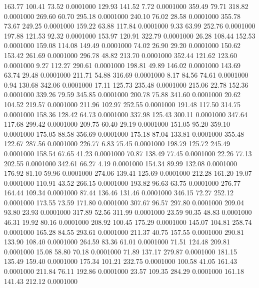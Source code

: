  163.77  100.41   73.52   0.0001000
 129.93  141.52    7.72   0.0001000
 359.49   79.71  318.82   0.0001000
 269.60   60.70  295.18   0.0001000
 240.10   76.02   28.58   0.0001000
 355.78   73.67  249.25   0.0001000
 159.22   63.88  117.84   0.0001000
   9.33   63.99  252.76   0.0001000
 197.88  121.53   92.32   0.0001000
 153.97  120.91  322.79   0.0001000
  26.28  108.44  152.53   0.0001000
 159.08  114.08  149.49   0.0001000
  74.02   26.90   29.20   0.0001000
 150.62  153.42  261.69   0.0001000
 296.78   48.82  213.70   0.0001000
 352.44  121.62  123.60   0.0001000
   9.27  112.27  290.61   0.0001000
 198.81   49.89  146.02   0.0001000
 143.69   63.74   29.48   0.0001000
 211.71   54.88  316.69   0.0001000
   8.17   84.56   74.61   0.0001000
   0.94  130.68  342.06   0.0001000
  17.11  125.73  235.48   0.0001000
 215.06   22.78  152.36   0.0001000
 339.26   79.59  345.85   0.0001000
 200.78   75.88  341.60   0.0001000
  20.62  104.52  219.57   0.0001000
 211.96  102.97  252.55   0.0001000
 191.48  117.50  314.75   0.0001000
 158.36  128.42   64.73   0.0001000
 337.98  125.43  300.11   0.0001000
 347.64  117.68  299.42   0.0001000
 209.75   60.40   29.19   0.0001000
 151.05   95.20  359.10   0.0001000
 175.05   88.58  356.69   0.0001000
 175.18   87.04  133.81   0.0001000
 355.48  122.67  287.56   0.0001000
 226.77    6.83   75.45   0.0001000
 198.79  125.72  245.49   0.0001000
 158.54   67.65   41.23   0.0001000
  70.87  138.49   77.45   0.0001000
  22.26   77.13  202.55   0.0001000
 342.61   66.27    4.19   0.0001000
 154.34   89.99  132.08   0.0001000
 176.92   81.10   59.96   0.0001000
 274.06  139.41  125.69   0.0001000
 212.28  161.20   19.07   0.0001000
 110.91   43.52  266.15   0.0001000
 193.82   96.63   63.75   0.0001000
 276.77  164.44  109.34   0.0001000
  87.44  136.46  131.46   0.0001000
 346.15   72.27  252.12   0.0001000
 173.55   73.59  171.80   0.0001000
 307.67   96.57  297.80   0.0001000
 209.04   93.80   23.93   0.0001000
 317.89   52.56  311.99   0.0001000
  23.59   90.35   48.83   0.0001000
  46.31   19.92   80.16   0.0001000
 208.92  100.45  175.29   0.0001000
 145.07  104.81  258.74   0.0001000
 165.28   84.55  293.61   0.0001000
 211.37   40.75  157.55   0.0001000
 290.81  133.90  108.40   0.0001000
 264.59   83.36   61.01   0.0001000
  71.51  124.48  209.81   0.0001000
  15.08   58.80   70.18   0.0001000
  71.89  137.17  279.87   0.0001000
 181.15  135.49  159.40   0.0001000
 175.34  101.21  232.75   0.0001000
 100.58   41.05  161.43   0.0001000
 211.84   76.11  192.86   0.0001000
  23.57  109.35  284.29   0.0001000
 161.18  141.43  212.12   0.0001000

